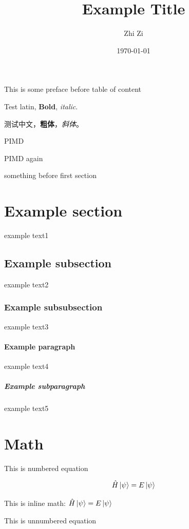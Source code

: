 \documentclass{article}
\title{Example Title}
\author{Zhi Zi}
\date{\today}
\begin{document}
\maketitle

This is some preface before table of content

Test latin, \textbf{Bold}, \textit{italic}.

测试中文，\textbf{粗体}，\textit{斜体}。

\gls{PIMD}

\Gls{PIMD} again

\tableofcontents

something before first section

\section{Example section}

example text1

\subsection{Example subsection}

example text2

\subsubsection{Example subsubsection}

example text3

\paragraph{Example paragraph}

example text4

\subparagraph{Example subparagraph}

example text5

\section{Math}

This is numbered equation

\begin{equation}
	\hat H \ket{\psi} = E \ket{\psi}
\end{equation}

This is inline math: \( \hat H \ket{\psi} = E \ket{\psi} \)

This is unnumbered equation
\end{document}
